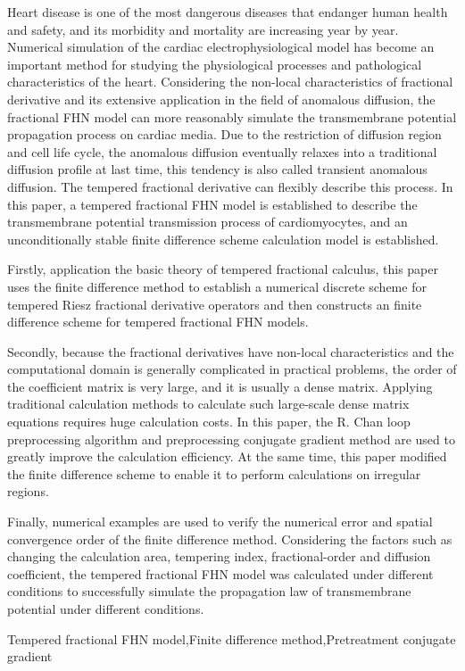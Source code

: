 \documentclass[twoside,UTF8]{nputhesis}
\begin{document}
\begin{Abstract}
	
Heart disease is one of the most dangerous diseases that endanger human health and safety, and its morbidity and mortality are increasing year by year. Numerical simulation of the cardiac electrophysiological model has become an important method for studying the physiological processes and pathological characteristics of the heart. Considering the non-local characteristics of fractional derivative and its extensive application in the field of anomalous diffusion, the fractional FHN model can more reasonably simulate the transmembrane potential propagation process on cardiac media. Due to the restriction of diffusion region and cell life cycle, the anomalous diffusion eventually relaxes into a traditional diffusion profile at last time, this tendency is also called transient anomalous diffusion. The tempered fractional derivative can flexibly describe this process. In this paper, a tempered fractional FHN model is established to describe the transmembrane potential transmission process of cardiomyocytes, and an unconditionally stable finite difference scheme calculation model is established.

Firstly, application the basic theory of tempered fractional calculus, this paper uses the finite difference method to establish a numerical discrete scheme for tempered Riesz fractional derivative operators and then constructs an finite difference scheme for tempered fractional FHN models. 

Secondly, because the fractional derivatives have non-local characteristics and the computational domain is generally complicated in practical problems, the order of the coefficient matrix is ​​very large, and it is usually a dense matrix. Applying traditional calculation methods to calculate such large-scale dense matrix equations requires huge calculation costs. In this paper, the R. Chan loop preprocessing algorithm and preprocessing conjugate gradient method are used to greatly improve the calculation efficiency. At the same time, this paper modified the finite difference scheme to enable it to perform calculations on irregular regions.

Finally, numerical examples are used to verify the numerical error and spatial convergence order of the finite difference method. Considering the factors such as changing the calculation area, tempering index, fractional-order and diffusion coefficient, the tempered fractional FHN model was calculated under different conditions to successfully simulate the propagation law of transmembrane potential under different conditions.

    \begin{Keywords}
      Tempered fractional FHN model,Finite difference method,Pretreatment conjugate gradient 
    \end{Keywords}
\end{Abstract}
\end{document}
